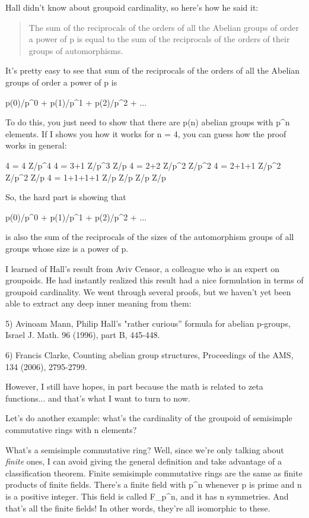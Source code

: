 Hall didn't know about groupoid cardinality, so here's how he said it:

\begin{quote}

The sum of the reciprocals of the orders of all the Abelian groups of
order a power of p is equal to the sum of the reciprocals of the
orders of their groups of automorphisms.

\end{quote}

It's pretty easy to see that sum of the reciprocals of the orders
of all the Abelian groups of order a power of p is

p(0)/p^{0} + p(1)/p^{1} + p(2)/p^{2} + ...

To do this, you just need to show that there are p(n) abelian groups
with p^{n} elements.  If I shows you how it works for n = 4,
you can guess how the proof works in general:

4 = 4                
     Z/p^{4}   
4 = 3+1                     Z/p^{3} \times  Z/p
4 = 2+2                    Z/p^{2} \times  Z/p^{2} 
4 = 2+1+1            Z/p^{2} \times  Z/p^{2} \times  Z/p
4 = 1+1+1+1         Z/p \times  Z/p \times  Z/p \times  Z/p

So, the hard part is showing that 

p(0)/p^{0} + p(1)/p^{1} + p(2)/p^{2} + ...

is also the sum of the reciprocals of the sizes of the
automorphism groups of all groups whose size is a power of p.

I learned of Hall's result from Aviv Censor, a colleague who is an
expert on groupoids.  He had instantly realized this result had a nice
formulation in terms of groupoid cardinality.  We went through
several proofs, but we haven't yet been able to extract any deep inner
meaning from them:

5) Avinoam Mann, Philip Hall's "rather curious'' formula for
abelian p-groups, Israel J. Math. 96 (1996), part B, 445-448.

6) Francis Clarke, Counting abelian group structures, Proceedings of
the AMS, 134 (2006), 2795-2799.

However, I still have hopes, in part because the math is related to
zeta functions... and that's what I want to turn to now.

Let's do another example: what's the cardinality of the groupoid of
semisimple commutative rings with n elements?

What's a semisimple commutative ring?  Well, since we're only talking
about \emph{finite} ones, I can avoid giving the general definition
and take advantage of a classification theorem.  Finite semisimple
commutative rings are the same as finite products of finite fields.
There's a finite field with p^{n} whenever p is prime and n is
a positive integer.  This field is called F_{p^{n}},
and it has n symmetries.  And that's all the finite fields!  In other
words, they're all isomorphic to these.

